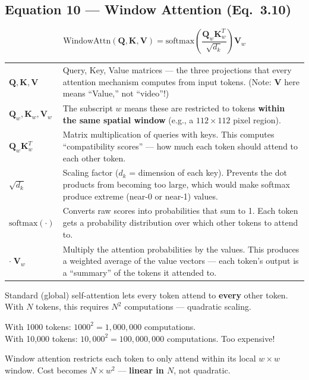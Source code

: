 \documentclass[12pt, a4paper]{article}
\begin{document}
\subsection{Equation 10 --- Window Attention (Eq.~3.10)}

\begin{eqbox}
\[
\text{WindowAttn}(\mathbf{Q}, \mathbf{K}, \mathbf{V}) = \text{softmax}\!\left(\frac{\mathbf{Q}_w \mathbf{K}_w^T}{\sqrt{d_k}}\right) \mathbf{V}_w
\]
\end{eqbox}

\begin{explainbox}
\begin{tabular}{lp{11cm}}
$\mathbf{Q}, \mathbf{K}, \mathbf{V}$ & Query, Key, Value matrices --- the three projections that every attention mechanism computes from input tokens. (Note: $\mathbf{V}$ here means ``Value,'' not ``video''!)\\[0.2cm]
$\mathbf{Q}_w, \mathbf{K}_w, \mathbf{V}_w$ & The subscript $w$ means these are restricted to tokens \textbf{within the same spatial window} (e.g., a $112 \times 112$ pixel region).\\[0.2cm]
$\mathbf{Q}_w \mathbf{K}_w^T$ & Matrix multiplication of queries with keys. This computes ``compatibility scores'' --- how much each token should attend to each other token.\\[0.2cm]
$\sqrt{d_k}$ & Scaling factor ($d_k$ = dimension of each key). Prevents the dot products from becoming too large, which would make softmax produce extreme (near-0 or near-1) values.\\[0.2cm]
$\text{softmax}(\cdot)$ & Converts raw scores into probabilities that sum to 1. Each token gets a probability distribution over which other tokens to attend to.\\[0.2cm]
$\cdot\; \mathbf{V}_w$ & Multiply the attention probabilities by the values. This produces a weighted average of the value vectors --- each token's output is a ``summary'' of the tokens it attended to.
\end{tabular}
\end{explainbox}

\begin{analogybox}
Standard (global) self-attention lets every token attend to \textbf{every} other token. With $N$ tokens, this requires $N^2$ computations --- quadratic scaling.

With 1000 tokens: $1000^2 = 1{,}000{,}000$ computations.\\
With 10,000 tokens: $10{,}000^2 = 100{,}000{,}000$ computations. Too expensive!

Window attention restricts each token to only attend within its local $w \times w$ window. Cost becomes $N \times w^2$ --- \textbf{linear in $N$}, not quadratic.
\end{analogybox}
\end{document}
